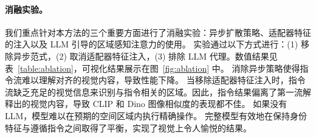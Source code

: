 \paragraph{消融实验。} 我们重点针对本方法的三个重要方面进行了消融实验：异步扩散策略、适配器特征的注入以及 LLM 引导的区域感知注意力的使用。
实验通过以下方式进行：(1) 移除异步范式，(2) 取消适配器特征注入，(3) 排除 LLM 代理。数值结果见表~\ref{table:ablation}，可视化结果展示在图~\ref{fig:ablation} 中。
消除异步策略使得指令流难以理解对齐的视觉内容，导致性能下降。
当移除适配器特征注入时，指令流缺乏充足的视觉信息来识别与指令相关的区域。因此，指令结果偏离了第一流解释出的视觉内容，导致 CLIP 和 Dino 图像相似度的表现都不佳。
如果没有 LLM，模型难以在预期的空间区域内执行精确操作。
完整模型有效地在保持身份特征与遵循指令之间取得了平衡，实现了视觉上令人愉悦的结果。

